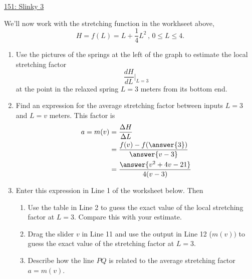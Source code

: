 \documentclass{ximera}
\begin{document}
\begin{example}
\begin{onlineOnly}
    \begin{center}
\end{center}
\end{onlineOnly}

\href{https://www.desmos.com/calculator/vjjibjkdrz}{151: Slinky 3}

We'll now work with the stretching function in the workhseet above,
\[
      H = f(L) = L + \frac{1}{4}L^2 \, , \, 0\leq L \leq 4.
\]

\begin{enumerate}
\item Use the pictures of the springs at the left of the graph to estimate the local stretching factor
\[
  \frac{dH}{dL}\Big|_{L=3}
\]
at the point in the relaxed spring $L=3$ meters from its bottom end.

\item Find an expression for the average stretching factor between inputs $L=3$ and $L=v$ meters. This factor is
\begin{align*}
  a= m(v) &= \frac{\Delta H}{\Delta L} \\
              &= \frac{f(v) - f(\answer{3})}{\answer{v-3}} \\
              &=\frac{\answer{v^2+4v-21}}{4(v-3)}  
\end{align*}
             
\item Enter this expression in Line 1 of the worksheet below. Then
\begin{enumerate}
\item Use the table in Line 2 to guess the exact value of the local stretching factor at $L=3$. Compare this with your estimate.

\item Drag the slider $v$ in Line 11 and use the output in Line 12 ($m(v))$ to guess the exact value of the stretching factor at $L=3$.

\item Describe how the line $PQ$ is related to the average stretching factor $a=m(v)$. 
\end{enumerate}

\begin{onlineOnly}
    \begin{center}
\end{center}
\end{onlineOnly}


\end{enumerate}
\end{example}
\end{document}
